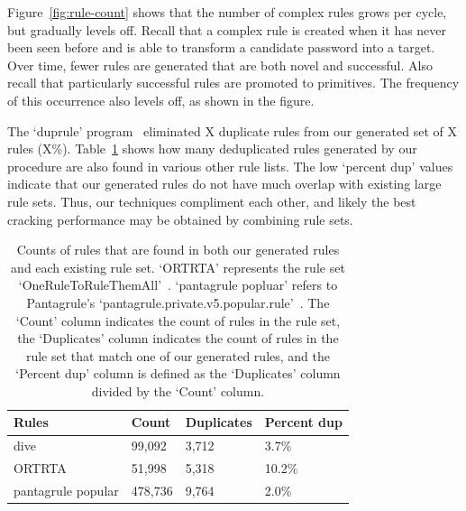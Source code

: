 \documentclass[letterpaper,twocolumn,10pt]{article}
\begin{document}
Figure~\ref{fig:rule-count} shows that the number of complex rules grows per cycle, but gradually levels off. Recall that a complex rule is created when it has never been seen before and is able to transform a candidate password into a target. Over time, fewer rules are generated that are both novel and successful. Also recall that particularly successful rules are promoted to primitives. The frequency of this occurrence also levels off, as shown in the figure.

The `duprule' program~\cite{duprule} eliminated X duplicate rules from our generated set of X rules (X\%). Table~\ref{tab:dups} shows how many deduplicated rules generated by our procedure are also found in various other rule lists. The low `percent dup' values indicate that our generated rules do not have much overlap with existing large rule sets. Thus, our techniques compliment each other, and likely the best cracking performance may be obtained by combining rule sets.

\begin{table}
\centering
\begin{tabular}{|l|l|l|l|}
    \hline
    Rules & Count & Duplicates & Percent dup \\
    \hline
    dive & 99,092& 3,712 & 3.7\% \\
    ORTRTA & 51,998 & 5,318 & 10.2\% \\
    pantagrule popular & 478,736 & 9,764 & 2.0\% \\
    \hline
\end{tabular}
\caption{Counts of rules that are found in both our generated rules and each existing rule set. `ORTRTA' represents the rule set `OneRuleToRuleThemAll'~\cite{ortrta}. `pantagrule popluar' refers to Pantagrule's `pantagrule.private.v5.popular.rule'~\cite{pantagrule}. The `Count' column indicates the count of rules in the rule set, the `Duplicates' column indicates the count of rules in the rule set that match one of our generated rules, and the `Percent dup' column is defined as the `Duplicates' column divided by the `Count' column.}
\label{tab:dups}
\end{table}
\end{document}
